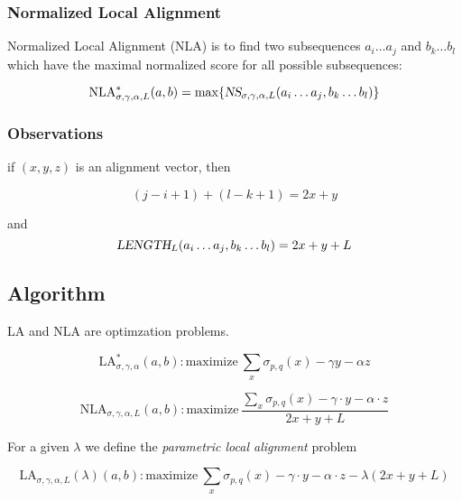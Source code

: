 \documentclass{article}
\begin{document}
\subsubsection*{Normalized Local Alignment}

Normalized Local Alignment (NLA) is to find two subsequences $a_i \dots a_j$
and $b_k \dots b_l$ which have the maximal normalized score for all possible
subsequences:

\begin{equation}
\text{NLA}^{*}_{\sigma,\gamma,\alpha,L}(a,b) = \max \lbrace
\textsl{NS}_{\sigma,\gamma,\alpha,L}(a_i \dots a_j,b_k \dots b_l) \rbrace
\end{equation}

\subsubsection*{Observations}

if $(x,y,z)$ is an alignment vector, then

\begin{equation}
(j-i+1) + (l-k+1)= 2 x + y 
\end{equation}

and 
\begin{equation}
\textsl{LENGTH}_{L}(a_i \dots a_j,b_k \dots b_l) =
2x + y + L
\end{equation}

\subsection{Algorithm}

LA and NLA are optimzation problems. 

\begin{equation}
\text{LA}^{*}_{\sigma, \gamma, \alpha}(a,b): \text{maximize}\ \sum_x
\sigma_{p,q}(x) -\gamma y - \alpha z
\end{equation}

\begin{equation}
\text{NLA}_{\sigma,\gamma,\alpha,L}(a,b): \text{maximize}\ \frac{\sum_x
\sigma_{p,q}(x)  - \gamma \cdot y- \alpha \cdot z}{2 x + y + L}
\end{equation}

For a given $\lambda$ we define the \emph{parametric local alignment} problem

\begin{equation}
\text{LA}_{\sigma,\gamma,\alpha,L}(\lambda)(a,b): \text{maximize}\ \sum_x
\sigma_{p,q}(x) - \gamma\cdot y- \alpha\cdot z - \lambda\left( 2
x +y + L \right)
\end{equation}
\end{document}
